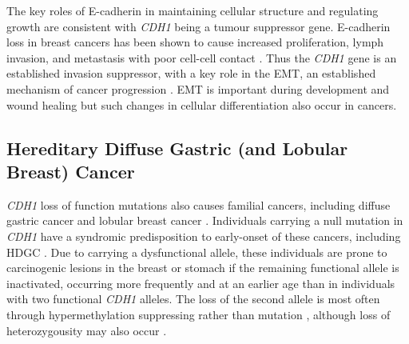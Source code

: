 The key roles of \gls{E-cadherin} in maintaining cellular structure and regulating growth are consistent with \textit{CDH1} being a \gls{tumour suppressor} gene. %
%
\gls{E-cadherin} loss in breast cancers has been shown to cause increased proliferation, lymph  invasion, and metastasis with poor cell-cell contact \citep{Berx2009}. Thus the \textit{CDH1} gene is an established invasion suppressor, with a key role in the \gls{EMT}, an established mechanism of cancer progression \citep{Hanahan2011}. \gls{EMT} is important during development and wound healing but such changes in cellular differentiation also occur in cancers. %

\subsection{Hereditary Diffuse Gastric (and Lobular Breast) Cancer}


\textit{CDH1} loss of function \glspl{mutation} also causes \gls{familial} cancers, including diffuse gastric cancer and lobular breast cancer \citep{HDGC,Graziano2003,Guilford2010,Oliveira2009}. Individuals carrying a null \gls{mutation} in \textit{CDH1} have a syndromic predisposition to early-onset of these cancers, including \gls{HDGC} \citep{Guilford1998}. Due to carrying a dysfunctional \gls{allele}, these individuals are prone to carcinogenic lesions in the breast or stomach if the remaining functional \gls{allele} is inactivated, occurring more frequently and at an earlier age than in individuals with two functional \textit{CDH1} \glspl{allele}. The loss of the second \gls{allele} is most often through hypermethylation suppressing  rather than \gls{mutation} \citep{Grady2000, Graziano2003, Oliveira2009, Machado2001}, although loss of heterozygousity may also occur \citep{Guilford2010}. 

